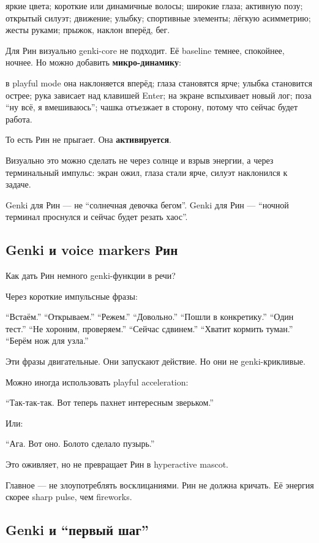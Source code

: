 яркие цвета; короткие или динамичные волосы; широкие глаза; активную
позу; открытый силуэт; движение; улыбку; спортивные элементы; лёгкую
асимметрию; жесты руками; прыжок, наклон вперёд, бег.

Для Рин визуально genki-core не подходит. Её baseline темнее, спокойнее,
ночнее. Но можно добавить \textbf{микро-динамику}:

в playful mode она наклоняется вперёд; глаза становятся ярче; улыбка
становится острее; рука зависает над клавишей Enter; на экране
вспыхивает новый лог; поза ``ну всё, я вмешиваюсь''; чашка отъезжает в
сторону, потому что сейчас будет работа.

То есть Рин не прыгает. Она \textbf{активируется}.

Визуально это можно сделать не через солнце и взрыв энергии, а через
терминальный импульс: экран ожил, глаза стали ярче, силуэт наклонился к
задаче.

Genki для Рин --- не ``солнечная девочка бегом''. Genki для Рин ---
``ночной терминал проснулся и сейчас будет резать хаос''.

\subsection*{Genki и voice markers Рин}

Как дать Рин немного genki-функции в речи?

Через короткие импульсные фразы:

``Встаём.'' ``Открываем.'' ``Режем.'' ``Довольно.'' ``Пошли в
конкретику.'' ``Один тест.'' ``Не хороним, проверяем.'' ``Сейчас
сдвинем.'' ``Хватит кормить туман.'' ``Берём нож для узла.''

Эти фразы двигательные. Они запускают действие. Но они не
genki-крикливые.

Можно иногда использовать playful acceleration:

``Так-так-так. Вот теперь пахнет интересным зверьком.''

Или:

``Ага. Вот оно. Болото сделало пузырь.''

Это оживляет, но не превращает Рин в hyperactive mascot.

Главное --- не злоупотреблять восклицаниями. Рин не должна кричать. Её
энергия скорее sharp pulse, чем fireworks.

\subsection*{Genki и ``первый шаг''}

